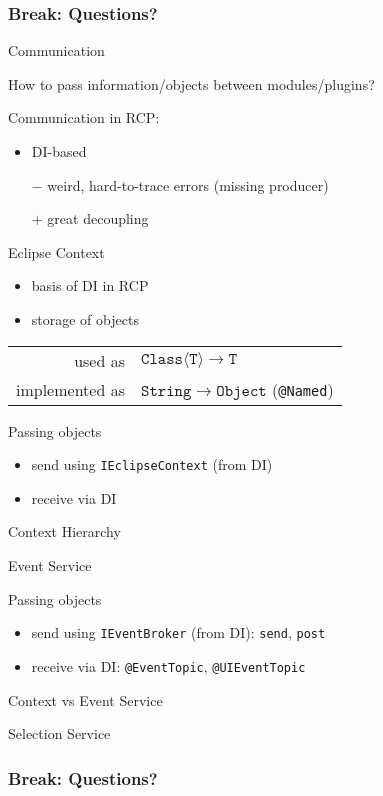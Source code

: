 \documentclass{beamer}
\newcommand{\eg}{\textcolor{pumpkin}{\raisebox{-0.5mm}{\HandRight}}}
\newcommand{\breakframe}{\begin{fillerframe}\frametitle{Break: Questions?}\end{fillerframe}}
\newenvironment{centerblock}{\begin{block}{}\begin{center}}{\end{center}\end{block}}
\newcommand{\ttt}[1]{\texttt{#1}}
\newcommand{\mtt}[1]{\ensuremath{\mathtt{#1}}}
\begin{document}
\breakframe

\begin{frame}{Communication}%
	\begin{centerblock}How to pass information/objects between modules/plugins?\end{centerblock}

	\medskip

	Communication in RCP:
	\begin{itemize}
		\item DI-based
		\item[$-$] weird, hard-to-trace errors (missing producer)
		\item[$+$] great decoupling
	\end{itemize}
\end{frame}%
\begin{frame}{Eclipse Context}%
	\begin{itemize}
		\item basis of DI in RCP
		\item storage of objects
	\end{itemize}
	\begin{centerblock}\begin{tabular}{rl}
		used as & $\mtt{Class\langle T\rangle}\to\mtt{T}$\\
		implemented as & $\mtt{String} \to \mtt{Object}$ (\ttt{@Named})\\
	\end{tabular}\end{centerblock}
	Passing objects \eg
	\begin{itemize}
		\item send using \ttt{IEclipseContext} (from DI)
		\item receive via DI
	\end{itemize}
\end{frame}%
\begin{frame}{Context Hierarchy}

\end{frame}
\begin{frame}{Event Service}


	Passing objects \eg
	\begin{itemize}
		\item send using \ttt{IEventBroker} (from DI): \ttt{send}, \ttt{post}
		\item receive via DI: \ttt{@EventTopic}, \ttt{@UIEventTopic}
	\end{itemize}
\end{frame}
\begin{frame}{Context \hfill vs \hfill Event Service}
\end{frame}
\begin{frame}{Selection Service}
\end{frame}

\breakframe
\end{document}
